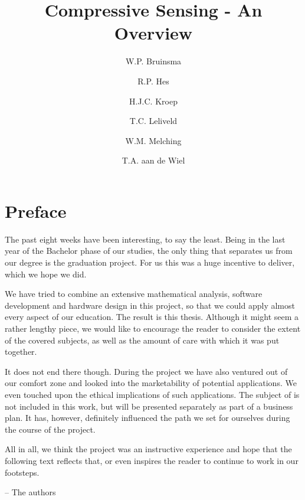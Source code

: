 \documentclass[a4paper, openany, oneside]{memoir}
\title{Compressive Sensing - An Overview}
\author{W.P. Bruinsma \and R.P. Hes \and H.J.C. Kroep \and T.C. Leliveld \and W.M. Melching \and T.A. aan de Wiel}
\begin{document}
\chapter{Preface}
The past eight weeks have been interesting, to say the least. Being in the last year of the Bachelor phase of our studies, the only thing that separates us from our degree is the graduation project. For us this was a huge incentive to deliver, which we hope we did. 

We have tried to combine an extensive mathematical analysis, software development and hardware design in this project, so that we could apply almost every aspect of our education. The result is this thesis. Although it might seem a rather lengthy piece, we would like to encourage the reader to consider the extent of the covered subjects, as well as the amount of care with which it was put together.

It does not end there though. During the project we have also ventured out of our comfort zone and looked into the marketability of potential applications. We even touched upon the ethical implications of such applications. The subject of is not included in this work, but will be presented separately as part of a business plan. It has, however, definitely influenced the path we set for ourselves during the course of the project.

All in all, we think the project was an instructive experience and hope that the following text reflects that, or even inspires the reader to continue to work in our footsteps.

\raggedleft -- The authors \qquad\qquad\qquad
\end{document}
